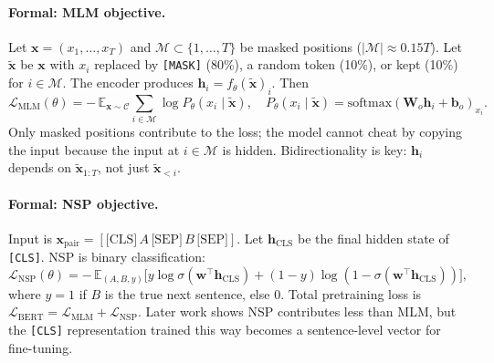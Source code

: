 \paragraph{Formal: MLM objective.} Let $\mathbf{x}=(x_1,\dots,x_T)$ and $\mathcal{M}\subset\{1,\dots,T\}$ be masked positions ($|\mathcal{M}|\approx 0.15T$). Let $\tilde{\mathbf{x}}$ be $\mathbf{x}$ with $x_i$ replaced by \texttt{[MASK]} (80\%), a random token (10\%), or kept (10\%) for $i\in\mathcal{M}$. The encoder produces $\mathbf{h}_i=f_\theta(\tilde{\mathbf{x}})_i$. Then
\begin{equation}
\mathcal{L}_{\text{MLM}}(\theta)= -\,\mathbb{E}_{\mathbf{x}\sim\mathcal{C}}\sum_{i\in\mathcal{M}}\log P_\theta(x_i\mid\tilde{\mathbf{x}}),\quad
P_\theta(x_i\mid\tilde{\mathbf{x}})=\mathrm{softmax}(\mathbf{W}_o\mathbf{h}_i+\mathbf{b}_o)_{x_i}.
\label{eq:mlm}
\end{equation}
Only masked positions contribute to the loss; the model cannot cheat by copying the input because the input at $i\in\mathcal{M}$ is hidden. Bidirectionality is key: $\mathbf{h}_i$ depends on $\tilde{\mathbf{x}}_{1:T}$, not just $\tilde{\mathbf{x}}_{<i}$.

\paragraph{Formal: NSP objective.} Input is $\mathbf{x}_{\text{pair}}=[\text{[CLS]}\,A\,\text{[SEP]}\,B\,\text{[SEP]}]$. Let $\mathbf{h}_{\text{CLS}}$ be the final hidden state of \texttt{[CLS]}. NSP is binary classification:
\begin{equation}
\mathcal{L}_{\text{NSP}}(\theta)= -\,\mathbb{E}_{(A,B,y)}\big[y\log\sigma(\mathbf{w}^\top\mathbf{h}_{\text{CLS}})+(1-y)\log(1-\sigma(\mathbf{w}^\top\mathbf{h}_{\text{CLS}}))\big],
\label{eq:nsp}
\end{equation}
where $y=1$ if $B$ is the true next sentence, else $0$. Total pretraining loss is $\mathcal{L}_{\text{BERT}}=\mathcal{L}_{\text{MLM}}+\mathcal{L}_{\text{NSP}}$. Later work shows NSP contributes less than MLM, but the \texttt{[CLS]} representation trained this way becomes a sentence-level vector for fine-tuning.

